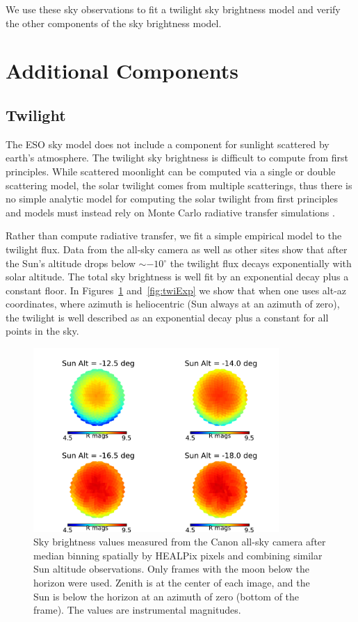 \documentclass[]{spie}
\newcommand\degree{{^\circ}}
\begin{document}
We use these sky observations to fit a twilight sky brightness model and verify the other components of the sky brightness model.

\section{Additional Components}\label{sec:twi}
\subsection{Twilight}

The ESO sky model does not include a component for sunlight scattered by earth's atmosphere.  The twilight sky brightness is difficult to compute from first principles.  While scattered moonlight can be computed via a single or double scattering model, the solar twilight comes from multiple scatterings, thus there is no simple analytic model for computing the solar twilight from first principles and models must instead rely on Monte Carlo radiative transfer simulations \cite{Patat06}.

Rather than compute radiative transfer, we fit a simple empirical model to the twilight flux.  Data from the all-sky camera as well as other sites show that after the Sun's altitude drops below $\sim-10\degree$ the twilight flux decays exponentially with solar altitude. The total sky brightness is well fit by an exponential decay plus a constant floor.  In Figures~\ref{fig:twiSky} and~\ref{fig:twiExp} we show that when one uses alt-az coordinates, where azimuth is heliocentric (Sun always at an azimuth of zero), the twilight is well described as an exponential decay plus a constant for all points in the sky.  %



\begin{figure}[ht]
  \begin{center}
  \includegraphics[height=7cm]{plots/twiExamples.pdf}
  \end{center}
  \caption{Sky brightness values measured from the Canon all-sky camera after median binning spatially by HEALPix pixels and combining similar Sun altitude observations. Only frames with the moon below the horizon were used. Zenith is at the center of each image, and the Sun is below the horizon at an azimuth of zero (bottom of the frame). The values are instrumental magnitudes.  \label{fig:twiSky}}
\end{figure}
\end{document}
